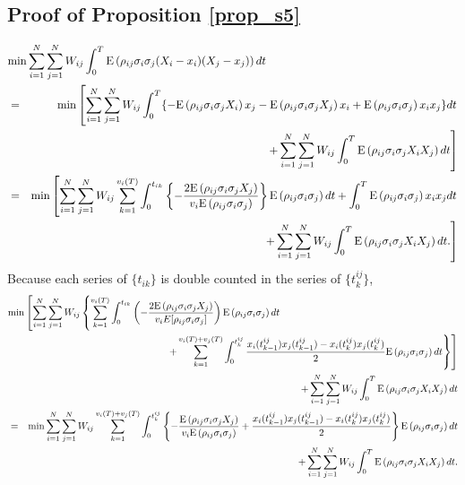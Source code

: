 \subsection{Proof of Proposition \ref{prop_s5}}
\begin{eqnarray*}
  \lefteqn{\min\sum_{i=1}^N \sum_{j=1}^N W_{ij}\int_0^T \ex{\rho_{ij}\sigma_i\sigma_j(X_i-x_i)(X_j-x_j)}dt}\\
    & = & \min \left[ \sum_{i=1}^N \sum_{j=1}^N W_{ij}\int_0^T \{-\ex{\rho_{ij}\sigma_i\sigma_jX_i}x_j-\ex{\rho_{ij}\sigma_i\sigma_jX_j}x_i+\ex{\rho_{ij}\sigma_i\sigma_j}x_ix_j\}dt \right.\\
    &   & \left. +\sum_{i=1}^N \sum_{j=1}^N W_{ij}\int_0^T \ex{\rho_{ij}\sigma_i\sigma_jX_iX_j}dt \right]\\
    & = & \min \left[ \sum_{i=1}^N \sum_{j=1}^N W_{ij} \sum_{k=1}^{v_i(T)}\int_0^{t_{ik}} \left\{-\frac{2\ex{\rho_{ij}\sigma_i\sigma_jX_j}}{v_i\ex{\rho_{ij}\sigma_i\sigma_j}} \right\} \ex{\rho_{ij}\sigma_i\sigma_j}dt+\int_0^T \ex{\rho_{ij}\sigma_i\sigma_j}x_ix_jdt \right.\\
    &   & \left. +\sum_{i=1}^N \sum_{j=1}^N W_{ij}\int_0^T \ex{\rho_{ij}\sigma_i\sigma_jX_iX_j}dt. \right]
\end{eqnarray*}
Because each series of $\{t_{ik}\}$ is double counted in the series of $\{t_k^{ij}\}$,
\begin{eqnarray*}
  \lefteqn{\min \left[ \sum_{i=1}^N \sum_{j=1}^N W_{ij} \left\{ \sum_{k=1}^{v_i(T)}\int_0^{t_{ik}} \left(-\frac{2\ex{\rho_{ij}\sigma_i\sigma_jX_j}}{v_iE[\rho_{ij}\sigma_i\sigma_j]}\right)\ex{\rho_{ij}\sigma_i\sigma_j}dt \right. \right.} \\
    &   & \left. \left. +\sum_{k=1}^{v_i(T)+v_j(T)}\int_0^{t_k^{ij}}\frac{x_i(t_{k-1}^{ij})x_j(t_{k-1}^{ij})-x_i(t_k^{ij})x_j(t_k^{ij})}{2} \ex{\rho_{ij}\sigma_i\sigma_j}dt \right\} \right]\\
    &   & +\sum_{i=1}^N \sum_{j=1}^N W_{ij}\int_0^T \ex{\rho_{ij}\sigma_i\sigma_jX_iX_j}dt \\
    & = & \min \sum_{i=1}^N \sum_{j=1}^N W_{ij} \sum_{k=1}^{v_i(T)+v_j(T)} \int_0^{t_k^{ij}} \left\{ -\frac{\ex{\rho_{ij}\sigma_i\sigma_jX_j}}{v_i \ex{\rho_{ij}\sigma_i\sigma_j}}+\frac{x_i(t_{k-1}^{ij})x_j(t_{k-1}^{ij})-x_i(t_k^{ij})x_j(t_k^{ij})}{2}\right\}\ex{\rho_{ij}\sigma_i\sigma_j}dt \\
    &   & +\sum_{i=1}^N \sum_{j=1}^N W_{ij}\int_0^T \ex{\rho_{ij}\sigma_i\sigma_jX_iX_j} dt.
\end{eqnarray*}
